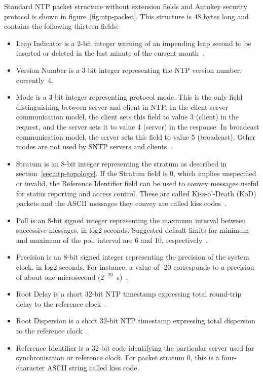 Standard NTP packet structure without extension fields and
Autokey security protocol is shown in figure~\ref{fig:ntp-packet}.
This structure is 48 bytes long and contains the following thirteen fields:
\begin{itemize}
\item
Leap Indicator is a 2-bit integer warning of an impending leap
second to be inserted or deleted in the last minute of the current month~\cite{rfc5905}.
\item
Version Number is a 3-bit integer representing the NTP
version number, currently~4.
\item
Mode is a 3-bit integer representing protocol mode.
This is the only field distinguishing between server and client in NTP.
In the client-server communication model, the client sets this field to value 3 (client) in the request,
and the server sets it to value 4 (server) in the response.
In broadcast communication model, the server sets this field to value 5 (broadcast).
Other modes are not used by SNTP servers and clients~\cite{rfc5905}.
\item
Stratum is an 8-bit integer representing the stratum as described in section~\ref{sec:ntp-topology}.
If the Stratum field is 0, which implies unspecified or invalid, the
Reference Identifier field can be used to convey messages useful for
status reporting and access control.
These are called Kiss-o'-Death (KoD)
packets and the ASCII messages they convey are called kiss codes~\cite{rfc5905}.
\item
Poll is an 8-bit signed integer representing the maximum interval between
successive messages, in log2 seconds.
Suggested default limits for minimum and maximum of the poll interval are 6 and 10, respectively~\cite{rfc5905}.
\item
Precision is an 8-bit signed integer representing the precision of the
system clock, in log2 seconds.
For instance, a value of -20
corresponds to a precision of about one microsecond ($2^{-20}$~s)~\cite{rfc5905}.
\item
Root Delay is a short 32-bit NTP timestamp expressing
total round-trip delay to the reference clock~\cite{rfc5905}.
\item
Root Dispersion is a short 32-bit NTP timestamp expressing
total dispersion to the reference clock~\cite{rfc5905}.
\item
Reference Identifier is a 32-bit code identifying the particular server used for synchronisation
or reference clock.
For packet stratum 0, this is a four-character ASCII string called kiss code.

\end{itemize}
